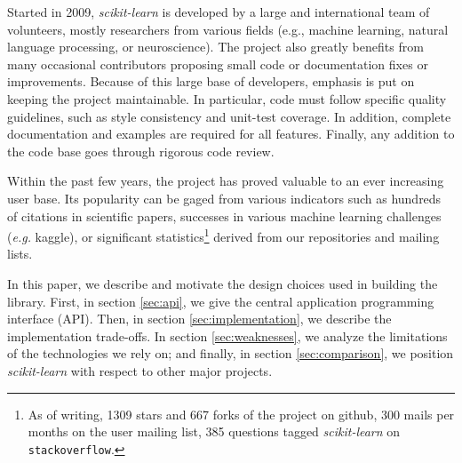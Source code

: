 \documentclass{llncs}
\begin{document}
Started in 2009, \textit{scikit-learn} is developed by a large and
international team of volunteers, mostly researchers from
various fields (e.g., machine learning, natural language processing, or
neuroscience). The project also greatly benefits from many occasional
contributors proposing small code or documentation fixes or improvements.
Because of this large base of developers, emphasis is put on keeping
the project maintainable. In particular, code must follow specific
quality guidelines, such as style consistency and unit-test coverage. In
addition, complete documentation and examples are required for all
features. Finally, any addition to the code base goes through rigorous
code review.

Within the past few years, the project has proved valuable to an ever
increasing user base. Its popularity can be gaged from various indicators
such as hundreds of citations in scientific papers, successes in various
machine learning challenges (\emph{e.g.} kaggle), or significant
statistics\footnote{As of writing, 1309 stars and 667 forks of the
project on github, 300 mails per months on the user mailing list, 385
questions tagged \emph{scikit-learn} on {\tt stackoverflow}.} derived from
our repositories and mailing lists.

In this paper, we describe and motivate the design choices used in
building the library. First, in section \ref{sec:api}, we give the
central application programming interface (API). Then, in section
\ref{sec:implementation}, we describe the implementation trade-offs.
In section \ref{sec:weaknesses}, we analyze the limitations of the
technologies we rely on; and finally, in section \ref{sec:comparison}, we
position \emph{scikit-learn} with respect to other major projects.


\end{document}
